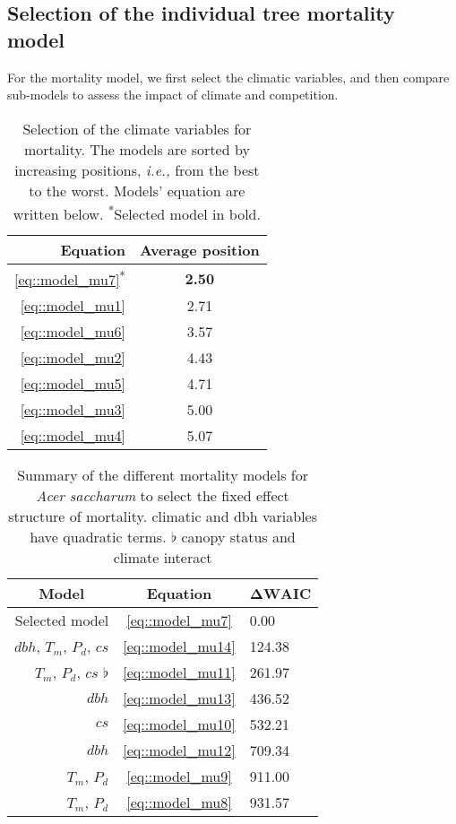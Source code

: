 \documentclass[letterpaper, 12pt]{article}
\newcommand {\ie}{\textit{i.e., }}
\theoremstyle{theo}
\begin{document}
\begin{refsection}
\begin{onehalfspace}
\subsection{Selection of the individual tree mortality model}
For the mortality model, we first select the climatic variables, and then compare sub-models to assess the impact of climate and competition.

\begin{table}[h!]
\centering
\caption{Selection of the climate variables for mortality. The models are sorted by increasing positions, \ie from the best to the worst. Models' equation are written below. \textsuperscript{*}Selected model in bold.}
\label{tab::climSelection_mu}
\begin{tabular}{@{}rc@{}}
	\toprule
	\textbf{Equation} & \textbf{Average position} \\
	\midrule
		\ref{eq::model_mu7}\textsuperscript{*} & \textbf{2.50} \\
		\ref{eq::model_mu1} & 2.71 \\
		\ref{eq::model_mu6} & 3.57 \\
		\ref{eq::model_mu2} & 4.43 \\
		\ref{eq::model_mu5} & 4.71 \\
		\ref{eq::model_mu3} & 5.00 \\
		\ref{eq::model_mu4} & 5.07 \\
	\bottomrule
\end{tabular}
\end{table}

\begin{table}
	\centering
	\caption{Summary of the different mortality models for \textit{Acer saccharum} to select the fixed effect structure of mortality. \dag climatic and dbh variables have quadratic terms. $ \flat $ canopy status and climate interact}
	\label{tab::acsa_fixeff_mu}
	\begin{tabular}{@{}rcl@{}}
	\toprule
	\multicolumn{1}{c}{\textbf{Model}} & \multicolumn{1}{c}{\textbf{Equation}} & \multicolumn{1}{c}{$ \bm{\Delta \text{WAIC}} $} \\
	\midrule
		Selected model & \ref{eq::model_mu7} & 0.00 \\
		$ dbh $, $ T_m $, $ P_d $, $ cs $ \dag & \ref{eq::model_mu14} & 124.38 \\
		$ T_m $, $ P_d $, $ cs $ \dag $ \flat $ & \ref{eq::model_mu11} & 261.97 \\
		$ dbh $ \dag & \ref{eq::model_mu13} & 436.52 \\
		$ cs $ & \ref{eq::model_mu10} & 532.21 \\
		$ dbh $ & \ref{eq::model_mu12} & 709.34 \\
		$ T_m $, $ P_d $ \dag & \ref{eq::model_mu9} & 911.00 \\
		$ T_m $, $ P_d $ & \ref{eq::model_mu8} & 931.57 \\
   \bottomrule
	\end{tabular}
\end{table}


\end{onehalfspace}
\end{refsection}
\end{document}
